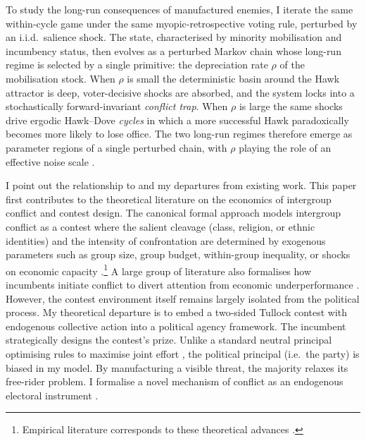 \documentclass[11pt,twoside]{extarticle}
\begin{document}

To study the long-run consequences of manufactured enemies, I iterate the same within-cycle game under the same myopic-retrospective voting rule, perturbed by an i.i.d.\ salience shock. The state, characterised by minority mobilisation and incumbency status, then evolves as a perturbed Markov chain whose long-run regime is selected by a single primitive: the depreciation rate $\rho$ of the mobilisation stock. When $\rho$ is small the deterministic basin around the Hawk attractor is deep, voter-decisive shocks are absorbed, and the system locks into a stochastically forward-invariant \emph{conflict trap}. When $\rho$ is large the same shocks drive ergodic Hawk--Dove \emph{cycles} in which a more successful Hawk paradoxically becomes more likely to lose office. The two long-run regimes therefore emerge as parameter regions of a single perturbed chain, with $\rho$ playing the role of an effective noise scale \citet{youngEvolutionConventions1993}. 


I point out the relationship to and my departures from existing work. This paper first contributes to the theoretical literature on the economics of intergroup conflict and contest design. The canonical formal approach models intergroup conflict as a contest where the salient cleavage (class, religion, or ethnic identities) and the intensity of confrontation are determined by exogenous parameters such as group size, group budget, within-group inequality, or shocks on economic capacity \citep*{estebanConflictDistribution1999, estebanSalienceEthnicConflict2008, caselliTheoryEthnicConflict2006, acharyaElectoralCampaignsDynamic2024}.\footnote{Empirical literature corresponds to these theoretical advances \citep{dalbóWORKERSWARRIORSCRIMINALS2011, rohnerWarSignalsTheory2013, dubeCommodityPriceShocks2013}.} A large group of literature also formalises how incumbents initiate conflict to divert attention from economic underperformance \citep*{hessWarDemocracy2001}. However, the contest environment itself remains largely isolated from the political process. My theoretical departure is to embed a two-sided Tullock contest \citep*{skaperdasContestSuccessFunctions1996,jiaStochasticDerivationRatio2008} with endogenous collective action into a political agency framework. The incumbent strategically designs the contest's prize. Unlike a standard neutral principal optimising rules to maximise joint effort \citep*{barutSymmetricMultiplePrize1998,fangTurningHeatDiscouraging2020}, the political principal (i.e.\ the party) is biased in my model. By manufacturing a visible threat, the majority relaxes its free-rider problem. I formalise a novel mechanism of conflict as an endogenous electoral instrument \citep{iyerReligiousRiotsElectoral2018, mitraImplicationsEconomicTheory2014}.
\end{document}
